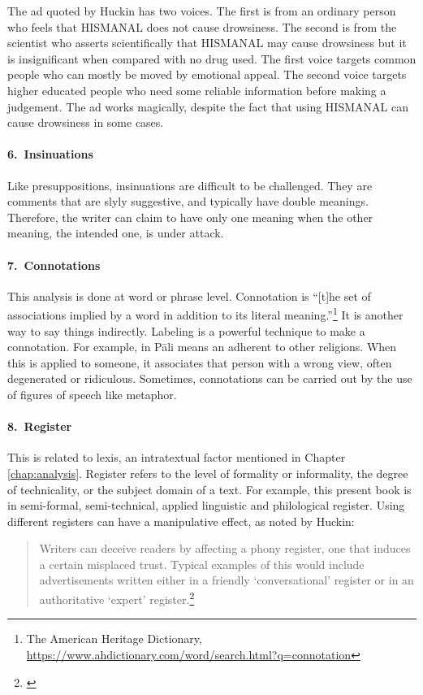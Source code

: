 The ad quoted by Huckin has two voices. The first is from an ordinary person who feels that HISMANAL does not cause drowsiness. The second is from the scientist who asserts scientifically that HISMANAL may cause drowsiness but it is insignificant when compared with no drug used. The first voice targets common people who can mostly be moved by emotional appeal. The second voice targets higher educated people who need some reliable information before making a judgement. The ad works magically, despite the fact that using HISMANAL can cause drowsiness in some cases.

\paragraph*{6.\ Insinuations} Like presuppositions, insinuations are difficult to be challenged. They are comments that are slyly suggestive, and typically have double meanings. Therefore, the writer can claim to have only one meaning when the other meaning, the intended one, is under attack.

\paragraph*{7.\ Connotations} This analysis is done at word or phrase level. Connotation is ``[t]he set of associations implied by a word in addition to its literal meaning.''\footnote{The American Heritage Dictionary, \url{https://www.ahdictionary.com/word/search.html?q=connotation}} It is another way to say things indirectly. Labeling is a powerful technique to make a connotation. For example, in P\=ali  means an adherent to other religions. When this is applied to someone, it associates that person with a wrong view, often degenerated or ridiculous. Sometimes, connotations can be carried out by the use of figures of speech like metaphor.

\paragraph*{8.\ Register} This is related to lexis, an intratextual factor mentioned in Chapter \ref{chap:analysis}. Register refers to the level of formality or informality, the degree of technicality, or the subject domain of a text. For example, this present book is in semi-formal, semi-technical, applied linguistic and philological register. Using different registers can have a manipulative effect, as noted by Huckin:

\begin{quote}
Writers can deceive readers by affecting a phony register, one that induces a certain misplaced trust. Typical examples of this would include advertisements written either in a friendly `conversational' register or in an authoritative `expert' register.\footnote{\citealp[p.~84]{huckin:cda}}
\end{quote}

